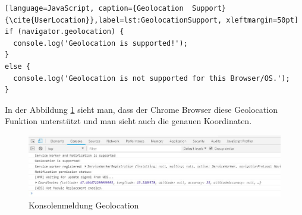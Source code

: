 \begin{lstlisting}[language=JavaScript, caption={Geolocation  Support} {\cite{UserLocation}},label=lst:GeolocationSupport, xleftmargin=50pt]
if (navigator.geolocation) {
  console.log('Geolocation is supported!');
}
else {
  console.log('Geolocation is not supported for this Browser/OS.');
}
\end{lstlisting}

In der Abbildung \ref{fig:GeoSupport} sieht man, dass der Chrome Browser diese Geolocation Funktion unterstützt und man sieht auch die genauen Koordinaten.

\begin{figure}[h]
	\centering
	\includegraphics[width=14cm]{BilderAllgemein/Geolocation/GeoSupport.jpg}\medskip
	\caption{Konsolenmeldung Geolocation}
	\label{fig:GeoSupport}
\end{figure}







